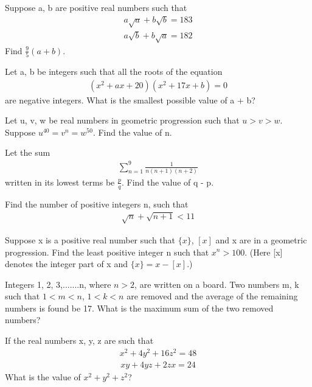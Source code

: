 \item Suppose a, b are positive real numbers such that
\begin{align*}
a\sqrt{a} + b\sqrt{b} = 183
\end{align*}
\begin{align*}
a\sqrt{b} + b\sqrt{a} = 182
\end{align*}
Find $\frac{9}{5}(a + b)$.

\item Let a, b be integers such that all the roots of the equation
\begin{align*}
(x^2 + ax + 20)(x^2 + 17x + b) = 0
\end{align*}
are negative integers. What is the smallest possible value of a + b?

\item Let u, v, w be real numbers in geometric progression such that $u > v > w$. Suppose $u^40 = v^n = w^50$. Find the value of n.

\item Let the sum
\begin{align*}
\sum_{n=1}^{9}\frac{1}{n(n + 1)(n  +2)}
\end{align*}
written in its lowest terms be $\frac{p}{q}$. Find the value of q - p.

\item Find the number of positive integers n, such that
\begin{align*}
\sqrt{n} + \sqrt{n + 1} < 11
\end{align*}

\item Suppose x is a positive real number such that $\{x\}$, $[x]$ and x are in a geometric progression. Find the least positive integer n such that $x^n > 100$. (Here [x] denotes the integer part of x and $\{x\} = x - [x]$.)

\item Integers 1, 2, 3,.......n, where $n > 2$, are written on a board. Two numbers m, k such that $1 < m < n$, $1 < k < n$ are removed and the average of the remaining numbers is found be 17. What is the maximum sum of the two removed numbers?

\item If the real numbers x, y, z are such that 
\begin{align}
x^2 + 4y^2 +16z^2 = 48 
\end{align} 
\begin{align}
xy + 4yz + 2zx = 24
\end{align}
What is the value of $x^2 + y^2 + z^2$?

